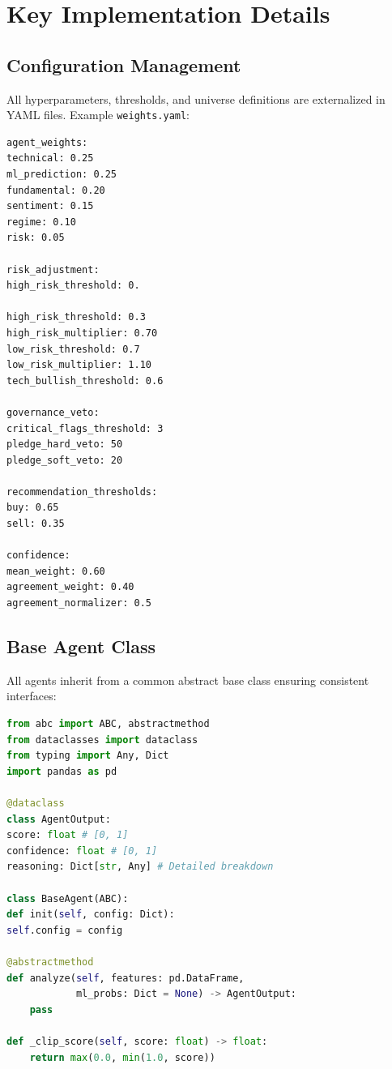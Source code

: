 \documentclass[12pt,a4paper]{report}
\begin{document}
\section{Key Implementation Details}

\subsection{Configuration Management}
All hyperparameters, thresholds, and universe definitions are externalized in YAML files. Example \texttt{weights.yaml}:
\begin{verbatim}
agent_weights:
technical: 0.25
ml_prediction: 0.25
fundamental: 0.20
sentiment: 0.15
regime: 0.10
risk: 0.05

risk_adjustment:
high_risk_threshold: 0.

high_risk_threshold: 0.3
high_risk_multiplier: 0.70
low_risk_threshold: 0.7
low_risk_multiplier: 1.10
tech_bullish_threshold: 0.6

governance_veto:
critical_flags_threshold: 3
pledge_hard_veto: 50
pledge_soft_veto: 20

recommendation_thresholds:
buy: 0.65
sell: 0.35

confidence:
mean_weight: 0.60
agreement_weight: 0.40
agreement_normalizer: 0.5
\end{verbatim}

\subsection{Base Agent Class}
All agents inherit from a common abstract base class ensuring consistent interfaces:
\begin{lstlisting}[language=Python, caption=Base Agent Class]
from abc import ABC, abstractmethod
from dataclasses import dataclass
from typing import Any, Dict
import pandas as pd

@dataclass
class AgentOutput:
score: float # [0, 1]
confidence: float # [0, 1]
reasoning: Dict[str, Any] # Detailed breakdown

class BaseAgent(ABC):
def init(self, config: Dict):
self.config = config

@abstractmethod
def analyze(self, features: pd.DataFrame, 
            ml_probs: Dict = None) -> AgentOutput:
    pass

def _clip_score(self, score: float) -> float:
    return max(0.0, min(1.0, score))
\end{lstlisting}
\end{document}
